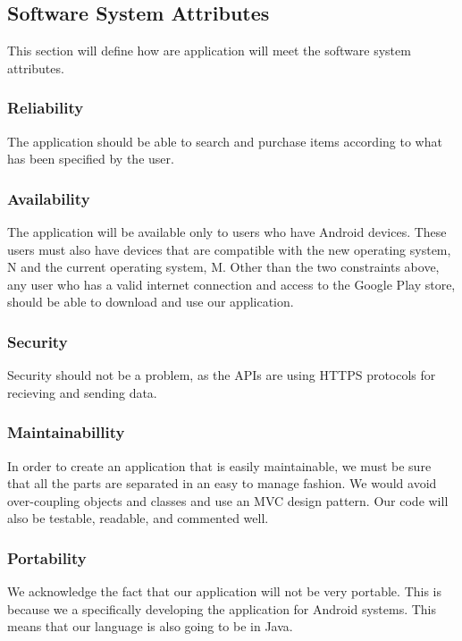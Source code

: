 \documentclass[journal,compsoc, 10pt, draftclsnofoot, onecolumn]{IEEEtran}
\begin{document}
\subsection{Software System Attributes}

This section will define how are application will meet the software system 
attributes.

\subsubsection{Reliability}

The application should be able to search and purchase items according to what 
has been specified by the user.

\subsubsection{Availability}

The application will be available only to users who have Android devices. These 
users must also have devices that are compatible with the new operating system, 
N and the current operating system, M. Other than the two constraints above, 
any user who has a valid internet connection and access to the Google Play 
store, should be able to download and use our application.

\subsubsection{Security}

Security should not be a problem, as the APIs are using HTTPS protocols for 
recieving and sending data.

\subsubsection{Maintainabillity}

In order to create an application that is easily maintainable, we must be sure 
that all the parts are separated in an easy to manage fashion. We would avoid 
over-coupling objects and classes and use an MVC design pattern. Our code 
will also be testable, readable, and commented well.

\subsubsection{Portability}

We acknowledge the fact that our application will not be very portable. This is 
because we a specifically developing the application for Android systems. This 
means that our language is also going to be in Java. 
\end{document}
